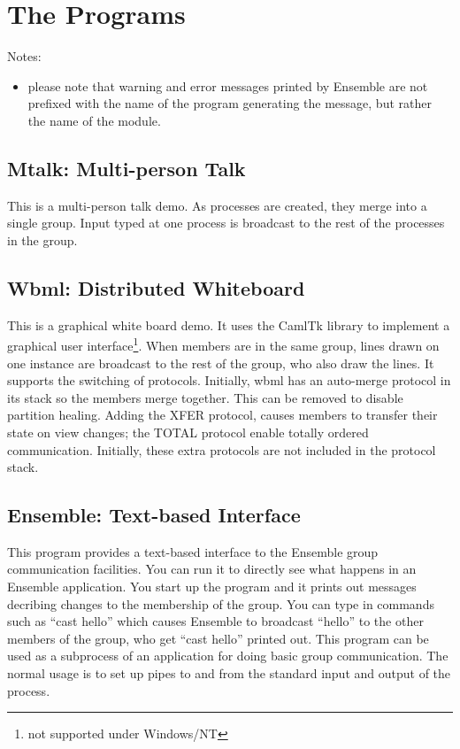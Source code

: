 \section{The Programs}

Notes:
\begin{itemize}
\item
please note that warning and error messages printed by Ensemble are
not prefixed with the name of the program generating the message, but
rather the name of the module.
\end{itemize}

\subsection{Mtalk: Multi-person Talk}
This is a multi-person talk demo.  As  processes are created, they merge
into a single group.  Input typed at one process is broadcast to the rest of the
processes in the group.

\subsection{Wbml: Distributed Whiteboard}
This is a graphical white board demo.  It uses the CamlTk library to implement a
graphical user interface\footnote{not supported under Windows/NT}.  When members are
in the same group, lines drawn on one instance are broadcast to the rest of the
group, who also draw the lines.  It supports the switching of protocols.  Initially,
wbml has an auto-merge protocol in its stack so the members merge together.  This can
be removed to disable partition healing.  Adding the XFER protocol, causes members to
transfer their state on view changes; the TOTAL protocol enable totally ordered
communication.  Initially, these extra protocols are not included in the protocol
stack.

\subsection{Ensemble: Text-based Interface}
\label{section:ensemble-demo}
This program provides a text-based interface to the Ensemble group
communication facilities.  You can run it to directly see what happens in an
Ensemble application.  You start up the program and it prints out messages
decribing changes to the membership of the group.  You can type in commands
such as ``cast hello'' which causes Ensemble to broadcast ``hello'' to the
other members of the group, who get ``cast hello'' printed out.  This program
can be used as a subprocess of an application for doing basic group
communication.  The normal usage is to set up pipes to and from the standard
input and output of the  process.


